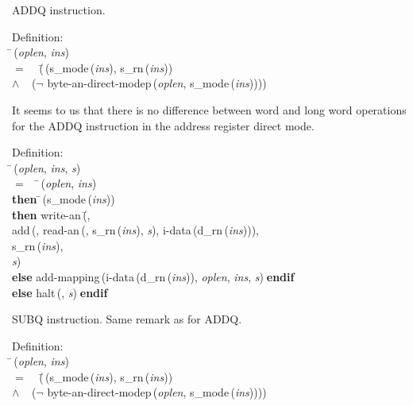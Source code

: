  ADDQ instruction.
\begin{tabbing}{\sc Definition}: \\  
\=\,({\it{oplen\/}}, {\it{ins\/}}) \\ 
$=$$\;\;\;\;$(\=\,({\rm{s\_mode}}\,({\it{ins\/}}), {\rm{s\_rn}}\,({\it{ins\/}})) \\ 
$\wedge$$\;\;\;\;$($\neg$ {\rm{byte-an-direct-modep}}\,({\it{oplen\/}}, {\rm{s\_mode}}\,({\it{ins\/}}))))\-\-
\end{tabbing}

 It seems to us that there is no
 difference between word and long word operations for the
 ADDQ instruction in the address register direct mode.

\begin{tabbing}{\sc Definition}: \\  
\=\,({\it{oplen\/}}, {\it{ins\/}}, {\it{s\/}}) \\ 
$=$$\;\;\;\;$\=\,({\it{oplen\/}}, {\it{ins\/}}) \\ 
{\bf then }\=\,({\rm{s\_mode}}\,({\it{ins\/}})) \\ 
{\bf then }{\rm{write-an}}\,(\=, \\ 
{\rm{add}}\,({}, {\rm{read-an}}\,({}, {\rm{s\_rn}}\,({\it{ins\/}}), {\it{s\/}}), {\rm{i-data}}\,({\rm{d\_rn}}\,({\it{ins\/}}))), \\ 
{\rm{s\_rn}}\,({\it{ins\/}}), \\ 
{\it{s\/}})\- \\ 
{\bf else }{\rm{add-mapping}}\,({\rm{i-data}}\,({\rm{d\_rn}}\,({\it{ins\/}})), {\it{oplen\/}}, {\it{ins\/}}, {\it{s\/}})$\;${\bf  endif}\- \\ 
{\bf else }{\rm{halt}}\,({}, {\it{s\/}})$\;${\bf  endif}\-\-
\end{tabbing}

 SUBQ instruction.
 Same remark as for ADDQ.
\begin{tabbing}{\sc Definition}: \\  
\=\,({\it{oplen\/}}, {\it{ins\/}}) \\ 
$=$$\;\;\;\;$(\=\,({\rm{s\_mode}}\,({\it{ins\/}}), {\rm{s\_rn}}\,({\it{ins\/}})) \\ 
$\wedge$$\;\;\;\;$($\neg$ {\rm{byte-an-direct-modep}}\,({\it{oplen\/}}, {\rm{s\_mode}}\,({\it{ins\/}}))))\-\-
\end{tabbing}

